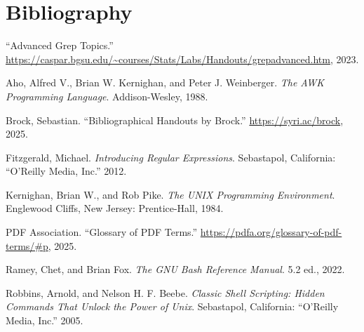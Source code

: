 \documentclass[
  letterpaper,
]{tufte-handout}
\newlength{\cslhangindent}
\newenvironment{CSLReferences}[2] %
 {\begin{list}{}{%
  \setlength{\itemindent}{0pt}
  \setlength{\leftmargin}{0pt}
  \setlength{\parsep}{0pt}
  \ifodd #1
   \setlength{\leftmargin}{\cslhangindent}
   \setlength{\itemindent}{-1\cslhangindent}
  \fi
  \setlength{\itemsep}{#2\baselineskip}}}
 {\end{list}}
\begin{document}
\section*{Bibliography}\label{bibliography}

\label{refs}
\begin{CSLReferences}{1}{0}
{``Advanced Grep Topics.''}
\url{https://caspar.bgsu.edu/~courses/Stats/Labs/Handouts/grepadvanced.htm},
2023.

Aho, Alfred V., Brian W. Kernighan, and Peter J. Weinberger. \emph{The
AWK Programming Language}. Addison-Wesley, 1988.

Brock, Sebastian. {``Bibliographical Handouts by Brock.''}
\url{https://syri.ac/brock}, 2025.

Fitzgerald, Michael. \emph{Introducing Regular Expressions}. Sebastapol,
California: {``O'Reilly Media, Inc.''} 2012.

Kernighan, Brian W., and Rob Pike. \emph{The UNIX Programming
Environment}. Englewood Cliffs, New Jersey: Prentice-Hall, 1984.

PDF Association. {``Glossary of PDF Terms.''}
\url{https://pdfa.org/glossary-of-pdf-terms/\#p}, 2025.

Ramey, Chet, and Brian Fox. \emph{The GNU Bash Reference Manual}. 5.2
ed., 2022.

Robbins, Arnold, and Nelson H. F. Beebe. \emph{Classic Shell Scripting:
Hidden Commands That Unlock the Power of Unix}. Sebastapol, California:
{``O'Reilly Media, Inc.''} 2005.

\end{CSLReferences}
\end{document}

